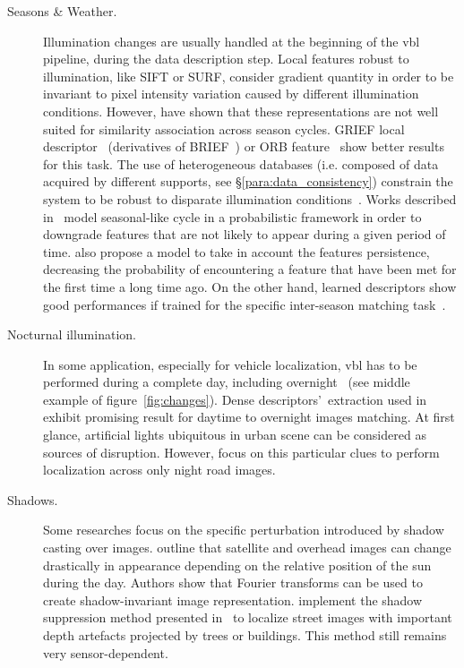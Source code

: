 			\begin{description}
				\item[Seasons \& Weather.]
					Illumination changes are usually handled at the beginning of the \ac{vbl} pipeline, during the data description step. Local features robust to illumination, like SIFT or SURF, consider gradient quantity in order to be invariant to pixel intensity variation caused by different illumination conditions. However, \citet{Valgren2010} have shown that these representations are not well suited for similarity association across season cycles. GRIEF local descriptor~\citep{Krajnik2017a} (derivatives of BRIEF~\citep{Calonder2010}) or ORB feature~\citep{Griffith2017} show better results for this task. The use of heterogeneous databases (i.e. composed of data acquired by different supports, see \S\ref{para:data_consistency}) constrain the system to be robust to disparate illumination conditions~\citep{Arandjelovic2017}. Works described in~\citep{Krajnik2014,Krajnik2017a} model seasonal-like cycle in a probabilistic framework in order to downgrade features that are not likely to appear during a given period of time. \citet{Rosen2016} also propose a model to take in account the features persistence, decreasing the probability of encountering a feature that have been met for the first time a long time ago.  On the other hand, learned descriptors show good performances if trained for the specific inter-season matching task~\citep{Carlevaris-Bianco2014}.

				\item[Nocturnal illumination.]
					In some application, especially for vehicle localization, \ac{vbl} has to be performed during a complete day, including overnight~\citep{McManus2014,Milford2015} (see middle example of figure~\ref{fig:changes}). Dense descriptors'~extraction used in \citep{Torii2015} exhibit promising result for daytime to overnight images matching. At first glance, artificial lights ubiquitous in urban scene can be considered as sources of disruption. However, \citet{Nelson2015} focus on this particular clues to perform localization across only night road images.
				
                \item[Shadows.]
					Some researches focus on the specific perturbation introduced by shadow casting over images. \citet{Wan2016} outline that satellite and overhead images can change drastically in appearance depending on the relative position of the sun during the day. Authors show that Fourier transforms can be used to create shadow-invariant image representation. \citet{Corke2013} implement the shadow suppression method presented in~\citep{Finlayson2006} to localize street images with important depth artefacts projected by trees or buildings. This method still remains very sensor-dependent.
			\end{description}

